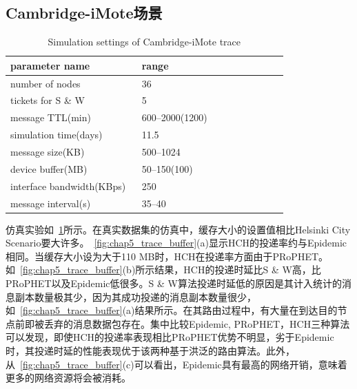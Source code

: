 \subsection{Cambridge-iMote场景}

\begin{table}[tbp]
\centering
\caption{Simulation settings of Cambridge-iMote trace}
\label{tab:chap5_simulation_trace}
\begin{tabular}{
p{0.45\linewidth}<{\centering}
p{0.5\linewidth}<{\centering}
}
\hline
\textbf{parameter name} & \textbf{range} \\
\hline
number of nodes & 36  \\
tickets for S \& W & 5  \\
message TTL(min) & 600--2000(1200) \\
simulation time(days) & 11.5 \\
message size(KB) & 500--1024 \\
device buffer(MB) & 50--150(100) \\
interface bandwidth(KBps) & 250 \\
message interval(s) & 35--40 \\
\hline
\end{tabular}
\end{table}

仿真实验如\tablename~\ref{tab:chap5_simulation_trace}所示。在真实数据集的仿真中，缓存大小的设置值相比Helsinki City Scenario要大许多。\figurename~\ref{fig:chap5_trace_buffer}(a)显示HCH的投递率约与Epidemic相同。当缓存大小设为大于110 MB时，HCH在投递率方面由于PRoPHET。如\figurename~\ref{fig:chap5_trace_buffer}(b)所示结果，HCH的投递时延比S \& W高，比PRoPHET以及Epidemic低很多。S \& W算法投递时延低的原因是其计入统计的消息副本数量极其少，因为其成功投递的消息副本数量很少，如\figurename~\ref{fig:chap5_trace_buffer}(a)结果所示。在其路由过程中，有大量在到达目的节点前即被丢弃的消息数据包存在。集中比较Epidemic, PRoPHET，HCH三种算法可以发现，即使HCH的投递率表现相比PRoPHET优势不明显，劣于Epidemic时，其投递时延的性能表现优于该两种基于洪泛的路由算法。此外，从\figurename~\ref{fig:chap5_trace_buffer}(c)可以看出，Epidemic具有最高的网络开销，意味着更多的网络资源将会被消耗。


